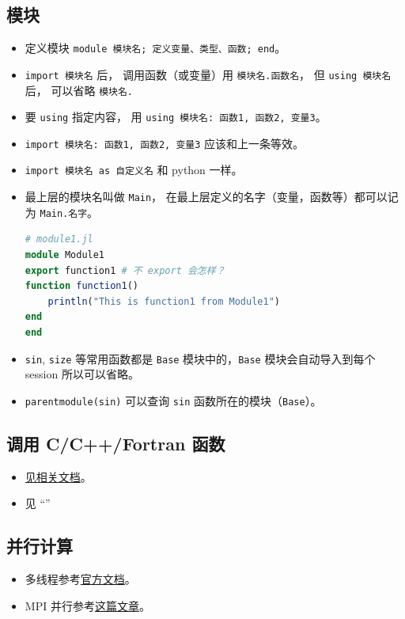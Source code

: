 \subsection{模块}
\begin{itemize}
\item 定义模块 \verb`module 模块名; 定义变量、类型、函数; end`。
\item \verb`import 模块名` 后， 调用函数（或变量）用 \verb`模块名.函数名`， 但 \verb`using 模块名` 后， 可以省略 \verb`模块名.`
\item 要 \verb`using` 指定内容， 用 \verb`using 模块名: 函数1, 函数2, 变量3`。
\item \verb`import 模块名: 函数1, 函数2, 变量3` 应该和上一条等效。
\item \verb`import 模块名 as 自定义名` 和 python 一样。
\item 最上层的模块名叫做 \verb`Main`， 在最上层定义的名字（变量，函数等）都可以记为 \verb`Main.名字`。
\begin{lstlisting}[language=julia]
# module1.jl
module Module1
export function1 # 不 export 会怎样？
function function1()
    println("This is function1 from Module1")
end
end
\end{lstlisting}
\item \verb`sin`, \verb`size` 等常用函数都是 \verb`Base` 模块中的，\verb`Base` 模块会自动导入到每个 session 所以可以省略。
\item \verb`parentmodule(sin)` 可以查询 \verb`sin` 函数所在的模块（\verb`Base`）。
\end{itemize}



\subsection{调用 C/C++/Fortran 函数}
\begin{itemize}
\item \href{https://docs.julialang.org/en/v1/manual/calling-c-and-fortran-code/}{见相关文档}。
\item 见 “”
\end{itemize}

\subsection{并行计算}
\begin{itemize}
\item 多线程参考\href{https://docs.julialang.org/en/v1/manual/multi-threading/}{官方文档}。
\item MPI 并行参考\href{http://www.claudiobellei.com/2018/09/30/julia-mpi/}{这篇文章}。
\end{itemize}

